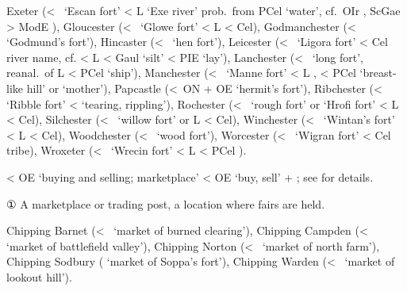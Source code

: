 \documentclass[12pt,letterpaper,oneside,article,draft]{memoir}
\begin{document}
\begin{Lemma}
\begin{Examples}
	Exeter (<~ ‘Escan fort’ < L  ‘Exe river’ prob.\ from PCel  ‘water’, cf.\ OIr , ScGae  > ModE ),
	Gloucester (<~ ‘Glowe fort’ < L  < Cel),
	Godmanchester (<~ ‘Godmund’s fort’),
	Hincaster (<~ ‘hen fort’),
	Leicester (<~ ‘Ligora fort’ < Cel river name, cf.  < L  < Gaul  ‘silt’ < PIE  ‘lay’),
	Lanchester (<~ ‘long fort’, reanal.\ of L  < PCel  ‘ship’),
	Manchester (<~ ‘Manne fort’ < L ,  < PCel  ‘breast-like hill’ or  ‘mother’),
	Papcastle (<~ON  + OE  ‘hermit’s fort’),
	Ribchester (<~ ‘Ribble fort’ <  ‘tearing, rippling’),
	Rochester (<~ ‘rough fort’ or  ‘Hrofi fort’ < L  < Cel),
	Silchester (<~ ‘willow fort’ or L  < Cel),
	Winchester (<~ ‘Wintan’s fort’ < L  < Cel),
	Woodchester (<~ ‘wood fort’),
	Worcester (<~ ‘Wigran fort’ < Cel  tribe),
	Wroxeter (<~ ‘Wrecin fort’ < L  < PCel ).
\end{Examples}
\end{Lemma}

\begin{Lemma}
\begin{Etymology}
	< OE  ‘buying and selling; marketplace’ <
		OE  ‘buy, sell’ +  ; see  for details.
\end{Etymology}
\begin{Definitions}
	① A marketplace or trading post, a location where fairs are held.
\end{Definitions}
\begin{Examples}
	Chipping Barnet (<~ ‘market of burned clearing’), Chipping Campden (<~ ‘market of battlefield valley’), Chipping Norton (<~ ‘market of north farm’), Chipping Sodbury ( ‘market of Soppa’s fort’), Chipping Warden (<~ ‘market of lookout hill’).
\end{Examples}
\end{Lemma}
\end{document}
